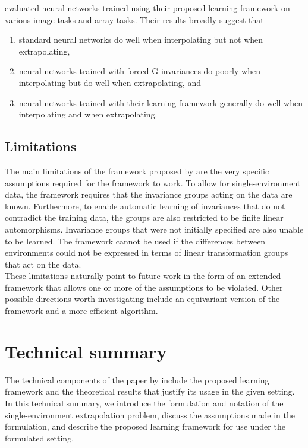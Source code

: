 \citeauthor{Mouli:2021} evaluated neural networks trained using their proposed learning framework on various image tasks and array tasks. Their results broadly suggest that
\begin{enumerate}

\item
standard neural networks do well when interpolating but not when extrapolating,

\item
neural networks trained with forced G-invariances do poorly when interpolating but do well when extrapolating, and

\item
neural networks trained with their learning framework generally do well when interpolating and when extrapolating.

\end{enumerate}

 
\subsection{Limitations}

The main limitations of the framework proposed by \textcite{Mouli:2021} are the very specific assumptions required for the framework to work. To allow for single-environment data, the framework requires that the invariance groups acting on the data are known. Furthermore, to enable automatic learning of invariances that do not contradict the training data, the groups are also restricted to be finite linear automorphisms. Invariance groups that were not initially specified are also unable to be learned. The framework cannot be used if the differences between environments could not be expressed in terms of linear transformation groups that act on the data.
\\

These limitations naturally point to future work in the form of an extended framework that allows one or more of the assumptions to be violated. Other possible directions worth investigating include an equivariant version of the framework and a more efficient algorithm.


\newpage


\section{Technical summary}

The technical components of the paper by \textcite{Mouli:2021} include the proposed learning framework and the theoretical results that justify its usage in the given setting. In this technical summary, we introduce the formulation and notation of the single-environment extrapolation problem, discuss the assumptions made in the formulation, and describe the proposed learning framework for use under the formulated setting.


